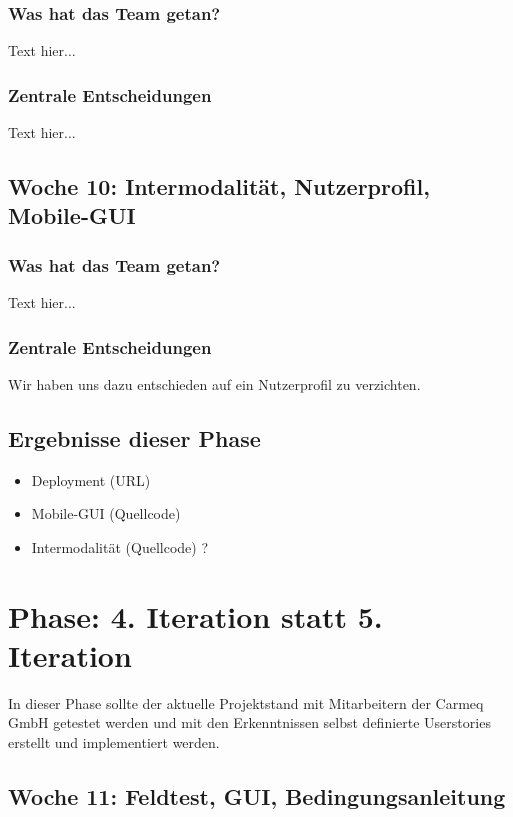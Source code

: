 \documentclass{article}
\begin{document}
\subsubsection{Was hat das Team getan?}

Text hier...

\subsubsection{Zentrale Entscheidungen}

Text hier...

\subsection{Woche 10: Intermodalit\"at, Nutzerprofil, Mobile-GUI}

\subsubsection{Was hat das Team getan?}

Text hier...

\subsubsection{Zentrale Entscheidungen}

Wir haben uns dazu entschieden auf ein Nutzerprofil zu verzichten.

\subsection{Ergebnisse dieser Phase}

\begin{itemize}
\item Deployment (URL)
\item Mobile-GUI (Quellcode)
\item Intermodalit\"at (Quellcode) ?
\end{itemize}

\section{Phase: 4. Iteration statt 5. Iteration}

In dieser Phase sollte der aktuelle Projektstand mit Mitarbeitern der Carmeq GmbH getestet werden und mit den Erkenntnissen selbst definierte Userstories erstellt und implementiert werden.

\subsection{Woche 11: Feldtest, GUI, Bedingungsanleitung}
\end{document}
